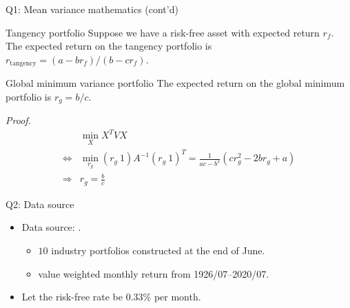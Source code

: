 \documentclass[10pt,t]{beamer}
\begin{document}
\begin{frame}{Q1: Mean variance mathematics (cont'd)}
\begin{block}{Tangency portfolio}
Suppose we have a risk-free asset with expected return $r_f$. The expected return on the tangency portfolio is $r_{\text{tangency}} = (a - b r_f)/(b - c r_f)$.
\end{block}

\begin{block}{Global minimum variance portfolio}
The expected return on the global minimum portfolio is $r_g = b/c$.

\baselineskip
\textit{Proof.}
\begin{equation*}
\begin{split}
& \min_{X} X^T V X \\
\Leftrightarrow & \min_{r_g} (r_g \ 1) A^{-1} (r_g \ 1)^T = \frac{1}{ac - b^2} (c r_g^2 - 2br_g + a) \\
\Rightarrow & r_g = \frac{b}{c}
\end{split}
\end{equation*}
\end{block}
\end{frame}



\begin{frame}{Q2: Data source}
\begin{itemize}
  \item Data source: \href{https://mba.tuck.dartmouth.edu/pages/faculty/ken.french/data_library.html}{}.
  \begin{itemize}
    \item $10$ industry portfolios constructed at the end of June.
    \item value weighted monthly return from 1926/07--2020/07.
  \end{itemize}
  \item Let the risk-free rate be $0.33\%$ per month.
\end{itemize}
\end{frame}
\end{document}
